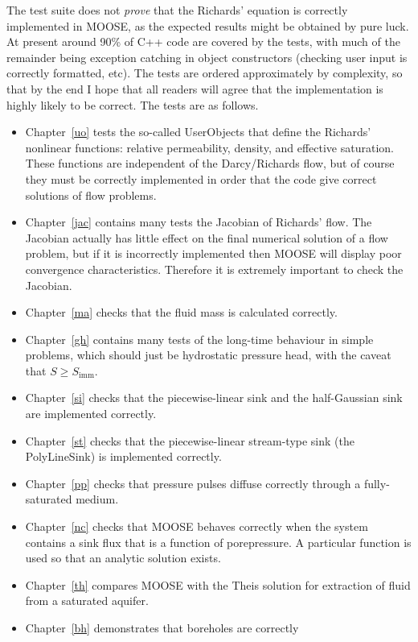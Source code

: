 \documentclass[]{scrreprt}
\begin{document}
The test suite does not {\em prove} that the Richards' equation is
correctly implemented in MOOSE, as the expected results might be
obtained by pure luck.  At present around 90\% of C++
code are covered by the tests, with much of the remainder being
exception catching in object constructors (checking user input is
correctly formatted, etc).  The tests are ordered approximately by
complexity, so that by the end I hope that all readers will agree that
the implementation is highly likely to be correct.  The tests are as
follows.
\begin{itemize}
\item Chapter~\ref{uo} tests the so-called UserObjects that define the
 Richards' nonlinear functions: relative permeability, density, and
 effective saturation.  These functions are independent of the
 Darcy/Richards flow, but of course they must be correctly implemented
 in order that the code give correct solutions of flow problems.
\item Chapter~\ref{jac} contains many tests the Jacobian of Richards'
  flow.  The Jacobian actually has little effect on the final
  numerical solution of a flow problem, but if it is incorrectly
  implemented then MOOSE will display poor convergence
  characteristics.  Therefore it is extremely important to check the
  Jacobian.
\item Chapter~\ref{ma} checks that the fluid mass is calculated correctly.
\item Chapter~\ref{gh} contains many tests of the long-time behaviour
  in simple problems, which should just be hydrostatic pressure head,
  with the caveat that $S\geq S_{\mathrm{imm}}$.
\item Chapter~\ref{si} checks that the piecewise-linear sink and the
  half-Gaussian sink are implemented correctly.
\item Chapter~\ref{st} checks that the piecewise-linear stream-type
  sink (the PolyLineSink) is implemented correctly.
\item Chapter~\ref{pp} checks that pressure pulses diffuse correctly
  through a fully-saturated medium.
\item Chapter~\ref{nc} checks that MOOSE behaves correctly when the
  system contains a sink flux that is a function of porepressure.  A
  particular function is used so that an analytic solution exists.
\item Chapter~\ref{th} compares MOOSE with the Theis solution for
  extraction of fluid from a saturated aquifer.
\item Chapter~\ref{bh} demonstrates that boreholes are correctly

\end{itemize}
\end{document}

